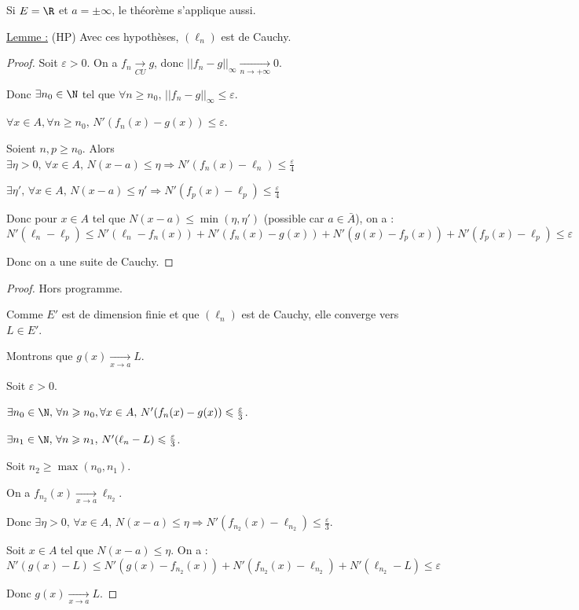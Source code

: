 \begin{remarque}
    Si $E = \R$ et $a = \pm \infty$, le théorème s'applique aussi.
\end{remarque}


\uline{Lemme :} (HP) Avec ces hypothèses, $(\ell_n)$ est de Cauchy.

\begin{proof}
    Soit $\varepsilon > 0$. On a $f_n \xrightarrow[CU]{} g$, donc $||f_n - g||_{\infty} \xrightarrow[n\to +\infty]{} 0$.

    Donc $\exists n_0 \in \N$ tel que $\forall n \geqslant n_0, \, || f_n - g ||_{\infty} \leqslant \varepsilon$.

    $\forall x \in A, \forall n \geqslant n_0, \, N'(f_n(x) - g(x)) \leqslant \varepsilon$.

    Soient $n, p \geqslant n_0$. Alors $\exists \eta > 0, \, \forall x \in A, \, N(x - a) \leqslant \eta \Rightarrow N'(f_n(x) - \ell_n) \leqslant \frac \varepsilon 4$

    $\exists \eta ', \, \forall x \in A, \, N(x - a) \leqslant \eta ' \Rightarrow N'(f_p(x) - \ell_p) \leqslant \frac \varepsilon 4$
    
    Donc pour $x \in A$ tel que $N(x - a) \leqslant \min(\eta, \eta ')$ (possible car $a \in \bar A$), on a :
    \[N'(\ell_n - \ell_p) \leqslant N'(\ell_n - f_n(x)) + N'(f_n(x) - g(x)) + N'(g(x) - f_p(x)) + N'(f_p(x) - \ell_p) \leqslant \varepsilon\]

    Donc on a une suite de Cauchy. 
\end{proof}

\begin{proof}
    Hors programme.
    
    Comme $E'$ est de dimension finie et que $(\ell_n)$ est de Cauchy, elle converge vers $L \in E'$.

    Montrons que $g(x) \xrightarrow[x \to a]{} L$.

        Soit $\varepsilon > 0$. 

        $\exists n_0 \in \N, \, \forall n \geqslant n_0, \forall x \in A, \, N'(f_n(x) - g(x)) \leqslant \frac \varepsilon 3$. 

        $\exists n_1 \in \N, \, \forall n \geqslant n_1, \, N'(\ell_n - L) \leqslant \frac \varepsilon 3$.

        Soit $n_2 \geqslant \max(n_0, n_1)$. 

        On a $f_{n_2}(x) \xrightarrow[x \to a]{} \ell_{n_2}$.

        Donc $\exists \eta > 0, \, \forall x \in A, \, N(x - a) \leqslant \eta \Rightarrow N'(f_{n_2}(x) - \ell_{n_2}) \leqslant \frac \varepsilon 3$.

        Soit $x \in A$ tel que $N(x - a) \leqslant \eta$. On a : 
        \[N'(g(x) - L) \leqslant N'(g(x) - f_{n_2}(x)) + N'(f_{n_2}(x) - \ell_{n_2}) + N'(\ell_{n_2} - L) \leqslant \varepsilon\]

        Donc $g(x) \xrightarrow[x \to a]{} L$.
\end{proof}


